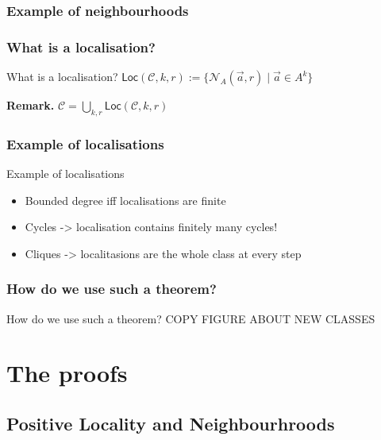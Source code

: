 \documentclass{beamer}
\newcommand{\tightlist}{}
\begin{document}
\subsubsection{Example of
neighbourhoods}\label{example-of-neighbourhoods}

\subsubsection{What is a localisation?}\label{what-is-a-localisation}

\begin{frame}{What is a localisation?}
\(\mathsf{Loc}(\mathcal{C},k, r) := \{ \mathcal{N}_{A}(\vec{a}, r) \mid  \vec{a} \in A^k \}\)

\textbf{Remark.}
\(\mathcal{C} = \bigcup_{k,r} \mathsf{Loc}(\mathcal{C},k, r)\)
\end{frame}

\subsubsection{Example of localisations}\label{example-of-localisations}

\begin{frame}{Example of localisations}
\begin{itemize}
\tightlist
\item
  Bounded degree iff localisations are finite
\item
  Cycles -\textgreater{} localisation contains finitely many cycles!
\item
  Cliques -\textgreater{} localitasions are the whole class at every
  step
\end{itemize}
\end{frame}

\subsubsection{How do we use such a
theorem?}\label{how-do-we-use-such-a-theorem}

\begin{frame}{How do we use such a theorem?}
COPY FIGURE ABOUT NEW CLASSES
\end{frame}

\section{The proofs}\label{the-proofs}

\subsection{Positive Locality and
Neighbourhroods}\label{positive-locality-and-neighbourhroods}
\end{document}

